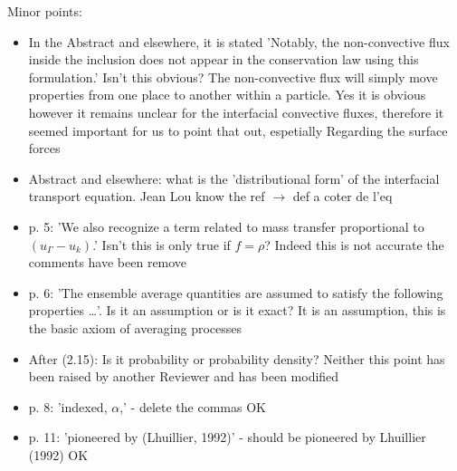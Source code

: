 \documentclass[10pt,a4paper]{article}
\newcommand{\tb}[1]{\color{blue}#1\color{black}}
\newcommand{\tr}[1]{\color{red}#1\color{black}}
\begin{document}
Minor points: 
\begin{itemize}
    \item In the Abstract and elsewhere, it is stated 'Notably, the non-convective flux inside the inclusion does not appear in the conservation law using this formulation.' Isn't this obvious?
    The non-convective flux will simply move properties from one place to another within a particle.
    \tb{Yes it is obvious however it remains unclear for the interfacial convective fluxes, therefore it seemed important for us to point that out,  espetially Regarding the surface forces}
    \item Abstract and elsewhere: what is the 'distributional form' of the interfacial transport equation.
    \tr{ Jean Lou know the ref $\to$ def a coter de l'eq}
    \item p. 5: 'We also recognize a term related to mass transfer proportional to $(u_\Gamma - u_k)$.' Isn't this is only true if $f = \rho$?
    \tb{Indeed this is not accurate the comments have been remove}
    \item p. 6: 'The ensemble average quantities are assumed to satisfy the following properties …'. Is it an assumption or is it exact?
    \tb{It is an assumption, this is the basic axiom of averaging processes}
    \item After (2.15): Is it probability or probability density?
    \tb{Neither this point has been raised by another Reviewer and has been modified}
    \item  p. 8: 'indexed, $\alpha$,' - delete the commas
    \tb{OK}
    \item  p. 11: 'pioneered by (Lhuillier, 1992)' - should be pioneered by Lhuillier (1992)
    \tb{OK}
\end{itemize}
\end{document}
